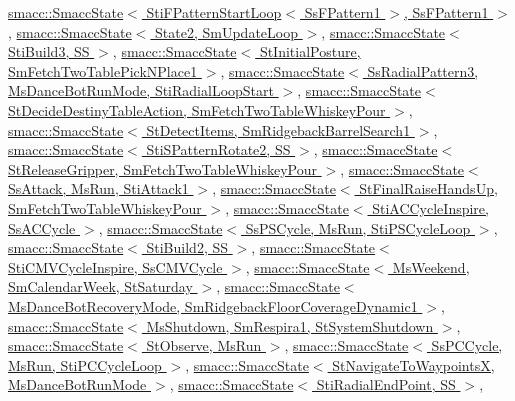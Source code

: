 \hyperlink{classsmacc_1_1SmaccState_afc39f8e0ca4001b2159a100da2fccd0e}{smacc\+::\+Smacc\+State$<$ Sti\+F\+Pattern\+Start\+Loop$<$ Ss\+F\+Pattern1 $>$, Ss\+F\+Pattern1 $>$}, \hyperlink{classsmacc_1_1SmaccState_afc39f8e0ca4001b2159a100da2fccd0e}{smacc\+::\+Smacc\+State$<$ State2, Sm\+Update\+Loop $>$}, \hyperlink{classsmacc_1_1SmaccState_afc39f8e0ca4001b2159a100da2fccd0e}{smacc\+::\+Smacc\+State$<$ Sti\+Build3, S\+S $>$}, \hyperlink{classsmacc_1_1SmaccState_afc39f8e0ca4001b2159a100da2fccd0e}{smacc\+::\+Smacc\+State$<$ St\+Initial\+Posture, Sm\+Fetch\+Two\+Table\+Pick\+N\+Place1 $>$}, \hyperlink{classsmacc_1_1SmaccState_afc39f8e0ca4001b2159a100da2fccd0e}{smacc\+::\+Smacc\+State$<$ Ss\+Radial\+Pattern3, Ms\+Dance\+Bot\+Run\+Mode, Sti\+Radial\+Loop\+Start $>$}, \hyperlink{classsmacc_1_1SmaccState_afc39f8e0ca4001b2159a100da2fccd0e}{smacc\+::\+Smacc\+State$<$ St\+Decide\+Destiny\+Table\+Action, Sm\+Fetch\+Two\+Table\+Whiskey\+Pour $>$}, \hyperlink{classsmacc_1_1SmaccState_afc39f8e0ca4001b2159a100da2fccd0e}{smacc\+::\+Smacc\+State$<$ St\+Detect\+Items, Sm\+Ridgeback\+Barrel\+Search1 $>$}, \hyperlink{classsmacc_1_1SmaccState_afc39f8e0ca4001b2159a100da2fccd0e}{smacc\+::\+Smacc\+State$<$ Sti\+S\+Pattern\+Rotate2, S\+S $>$}, \hyperlink{classsmacc_1_1SmaccState_afc39f8e0ca4001b2159a100da2fccd0e}{smacc\+::\+Smacc\+State$<$ St\+Release\+Gripper, Sm\+Fetch\+Two\+Table\+Whiskey\+Pour $>$}, \hyperlink{classsmacc_1_1SmaccState_afc39f8e0ca4001b2159a100da2fccd0e}{smacc\+::\+Smacc\+State$<$ Ss\+Attack, Ms\+Run, Sti\+Attack1 $>$}, \hyperlink{classsmacc_1_1SmaccState_afc39f8e0ca4001b2159a100da2fccd0e}{smacc\+::\+Smacc\+State$<$ St\+Final\+Raise\+Hands\+Up, Sm\+Fetch\+Two\+Table\+Whiskey\+Pour $>$}, \hyperlink{classsmacc_1_1SmaccState_afc39f8e0ca4001b2159a100da2fccd0e}{smacc\+::\+Smacc\+State$<$ Sti\+A\+C\+Cycle\+Inspire, Ss\+A\+C\+Cycle $>$}, \hyperlink{classsmacc_1_1SmaccState_afc39f8e0ca4001b2159a100da2fccd0e}{smacc\+::\+Smacc\+State$<$ Ss\+P\+S\+Cycle, Ms\+Run, Sti\+P\+S\+Cycle\+Loop $>$}, \hyperlink{classsmacc_1_1SmaccState_afc39f8e0ca4001b2159a100da2fccd0e}{smacc\+::\+Smacc\+State$<$ Sti\+Build2, S\+S $>$}, \hyperlink{classsmacc_1_1SmaccState_afc39f8e0ca4001b2159a100da2fccd0e}{smacc\+::\+Smacc\+State$<$ Sti\+C\+M\+V\+Cycle\+Inspire, Ss\+C\+M\+V\+Cycle $>$}, \hyperlink{classsmacc_1_1SmaccState_afc39f8e0ca4001b2159a100da2fccd0e}{smacc\+::\+Smacc\+State$<$ Ms\+Weekend, Sm\+Calendar\+Week, St\+Saturday $>$}, \hyperlink{classsmacc_1_1SmaccState_afc39f8e0ca4001b2159a100da2fccd0e}{smacc\+::\+Smacc\+State$<$ Ms\+Dance\+Bot\+Recovery\+Mode, Sm\+Ridgeback\+Floor\+Coverage\+Dynamic1 $>$}, \hyperlink{classsmacc_1_1SmaccState_afc39f8e0ca4001b2159a100da2fccd0e}{smacc\+::\+Smacc\+State$<$ Ms\+Shutdown, Sm\+Respira1, St\+System\+Shutdown $>$}, \hyperlink{classsmacc_1_1SmaccState_afc39f8e0ca4001b2159a100da2fccd0e}{smacc\+::\+Smacc\+State$<$ St\+Observe, Ms\+Run $>$}, \hyperlink{classsmacc_1_1SmaccState_afc39f8e0ca4001b2159a100da2fccd0e}{smacc\+::\+Smacc\+State$<$ Ss\+P\+C\+Cycle, Ms\+Run, Sti\+P\+C\+Cycle\+Loop $>$}, \hyperlink{classsmacc_1_1SmaccState_afc39f8e0ca4001b2159a100da2fccd0e}{smacc\+::\+Smacc\+State$<$ St\+Navigate\+To\+Waypoints\+X, Ms\+Dance\+Bot\+Run\+Mode $>$}, \hyperlink{classsmacc_1_1SmaccState_afc39f8e0ca4001b2159a100da2fccd0e}{smacc\+::\+Smacc\+State$<$ Sti\+Radial\+End\+Point, S\+S $>$}, 